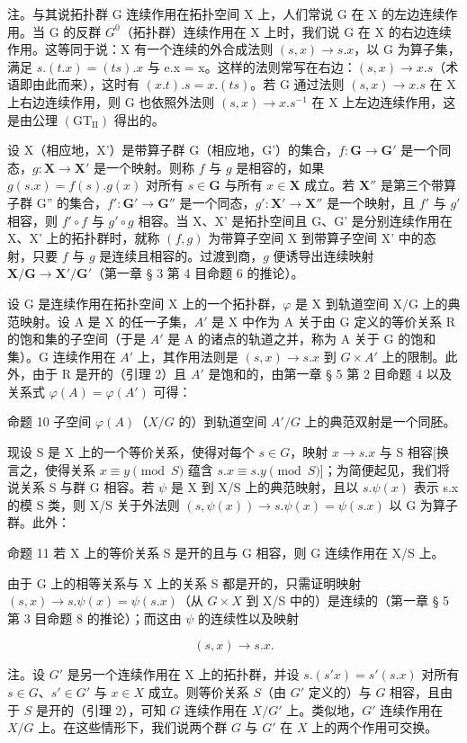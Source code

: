 注。与其说拓扑群 G 连续作用在拓扑空间 X 上，人们常说 G 在 X 的左边连续作用。当 G 的反群 \(G^{0}\)（拓扑群）连续作用在 X 上时，我们说 G 在 X 的右边连续作用。这等同于说：X 有一个连续的外合成法则 \((s, x) \to s.x\)，以 G 为算子集，满足 \(s.(t.x) = (ts).x\) 与 e.x = x。这样的法则常写在右边：\((s, x) \to x.s\)（术语即由此而来），这时有 \((x.t).s = x.(ts)\)。若 G 通过法则 \((s, x) \to x.s\) 在 X 上右边连续作用，则 G 也依照外法则 \((s, x) \to x.s^{-1}\) 在 X 上左边连续作用，这是由公理 \((\mathrm{GT}_{\mathrm{II}})\) 得出的。

设 X（相应地，X'）是带算子群 G（相应地，G'）的集合，\(f: \mathbf{G} \to \mathbf{G}'\) 是一个同态，\(g: \mathbf{X} \to \mathbf{X}'\) 是一个映射。则称 \(f\) 与 \(g\) 是相容的，如果 \(g(s.x) = f(s).g(x)\) 对所有 \(s \in \mathbf{G}\) 与所有 \(x \in \mathbf{X}\) 成立。若 \(\mathbf{X}''\) 是第三个带算子群 G'' 的集合，\(f': \mathbf{G}' \to \mathbf{G}''\) 是一个同态，\(g': \mathbf{X}' \to \mathbf{X}''\) 是一个映射，且 \(f'\) 与 \(g'\) 相容，则 \(f' \circ f\) 与 \(g' \circ g\) 相容。当 X、X' 是拓扑空间且 G、G' 是分别连续作用在 X、X' 上的拓扑群时，就称 \((f, g)\) 为带算子空间 X 到带算子空间 X' 中的态射，只要 \(f\) 与 \(g\) 是连续且相容的。过渡到商，\(g\) 便诱导出连续映射 \(\mathbf{X}/\mathbf{G} \to \mathbf{X}'/\mathbf{G}'\)（第一章 § 3 第 4 目命题 6 的推论）。

设 G 是连续作用在拓扑空间 X 上的一个拓扑群，\(\varphi\) 是 X 到轨道空间 X/G 上的典范映射。设 A 是 X 的任一子集，\(A'\) 是 X 中作为 A 关于由 G 定义的等价关系 R 的饱和集的子空间（于是 \(A'\) 是 A 的诸点的轨道之并，称为 A 关于 G 的饱和集）。G 连续作用在 \(A'\) 上，其作用法则是 \((s, x) \to s.x\) 到 \(G \times A'\) 上的限制。此外，由于 R 是开的（引理 2）且 \(A'\) 是饱和的，由第一章 § 5 第 2 目命题 4 以及关系式 \(\varphi(A) = \varphi(A')\) 可得：

命题 10 子空间 \(\varphi(A)\)（\(X/G\) 的）到轨道空间 \(A'/G\) 上的典范双射是一个同胚。

现设 S 是 X 上的一个等价关系，使得对每个 \(s \in G\)，映射 \(x \to s.x\) 与 S 相容{[}换言之，使得关系 \(x \equiv y \pmod{S}\) 蕴含 \(s.x \equiv s.y \pmod{S}\){]}；为简便起见，我们将说关系 S 与群 G 相容。若 \(\psi\) 是 X 到 X/S 上的典范映射，且以 \(s.\psi(x)\) 表示 s.x 的模 S 类，则 X/S 关于外法则 \((s, \psi(x)) \to s.\psi(x) = \psi(s.x)\) 以 G 为算子群。此外：

命题 11 若 X 上的等价关系 S 是开的且与 G 相容，则 G 连续作用在 X/S 上。

由于 G 上的相等关系与 X 上的关系 S 都是开的，只需证明映射 \((s,x)\to s.\psi(x)=\psi(s.x)\)（从 \(G\times X\) 到 X/S 中的）是连续的（第一章 § 5 第 3 目命题 8 的推论）；而这由 \(\psi\) 的连续性以及映射

\[
(s, x) \rightarrow s. x.
\]

注。设 \(G'\) 是另一个连续作用在 X 上的拓扑群，并设 \(s.(s'x) = s'(s.x)\) 对所有 \(s \in G\)、\(s' \in G'\) 与 \(x \in X\) 成立。则等价关系 \(S\)（由 \(G'\) 定义的）与 \(G\) 相容，且由于 \(S\) 是开的（引理 2），可知 \(G\) 连续作用在 \(X/G'\) 上。类似地，\(G'\) 连续作用在 \(X/G\) 上。在这些情形下，我们说两个群 \(G\) 与 \(G'\) 在 \(X\) 上的两个作用可交换。

